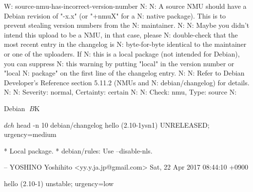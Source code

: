 \documentclass[mingoth,a4paper]{jsarticle}
\begin{document}
{{{{{{{{
\begin{commandline}
W: source-nmu-has-incorrect-version-number
N:
N:   A source NMU should have a Debian revision of "-x.x" (or "+nmuX" for a
N:   native package). This is to prevent stealing version numbers from the
N:   maintainer.
N:   
N:   Maybe you didn't intend this upload to be a NMU, in that case, please
N:   double-check that the most recent entry in the changelog is
N:   byte-for-byte identical to the maintainer or one of the uploaders. If
N:   this is a local package (not intended for Debian), you can suppress
N:   this warning by putting "local" in the version number or "local
N:   package" on the first line of the changelog entry.
N:   
N:   Refer to Debian Developer's Reference section 5.11.2 (NMUs and
N:   debian/changelog) for details.
N:   
N:   Severity: normal, Certainty: certain
N:   
N:   Check: nmu, Type: source
N:
\end{commandline}

Debian $B$K%

\begin{commandline}
$ dch
$ head -n 10 debian/changelog
hello (2.10-1ysn1) UNRELEASED; urgency=medium

  * Local package.
  * debian/rules: Use --disable-nls.

 -- YOSHINO Yoshihito <yy.y.ja.jp@gmail.com>  Sat, 22 Apr 2017 08:44:10 +0900

hello (2.10-1) unstable; urgency=low


\end{commandline}}}}}}}}}
\end{document}

